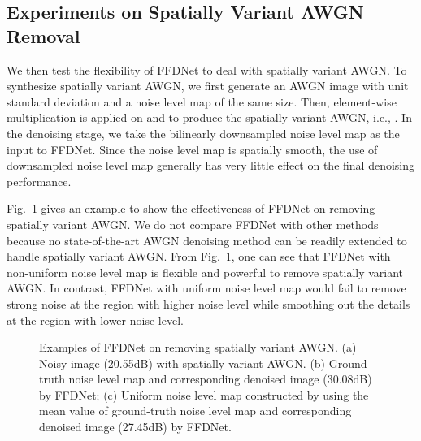 \documentclass[journal]{IEEEtran}
\begin{document}
\subsection{Experiments on Spatially Variant AWGN Removal}
We then test the flexibility of FFDNet to deal with spatially variant AWGN. To synthesize spatially variant AWGN, we first generate an AWGN image  with unit standard deviation and a noise level map  of the same size. Then, element-wise multiplication is applied on  and  to produce the spatially variant AWGN, i.e., .
In the denoising stage, we take the bilinearly downsampled noise level map as the input to FFDNet. Since the noise level map is spatially smooth, the use of downsampled noise level map generally has very little effect on the final denoising performance.


Fig.~\ref{fig_sv1} gives an example to show the effectiveness of FFDNet on removing spatially variant AWGN. We do not compare FFDNet with other methods because no state-of-the-art AWGN denoising method can be readily extended to handle spatially variant AWGN. From Fig.~\ref{fig_sv1}, one can see that FFDNet with non-uniform noise level map is flexible and powerful to remove spatially variant AWGN.
In contrast, FFDNet with uniform noise level map would fail to remove strong noise at the region with higher noise level while smoothing out the details at the region with lower noise level.


\begin{figure}[!htbp]
\setlength{\abovecaptionskip}{0pt}
\setlength{\belowcaptionskip}{0pt}
\centering
{}
\caption{Examples of FFDNet on removing spatially variant AWGN. (a) Noisy image (20.55dB) with spatially variant AWGN. (b) Ground-truth noise level map and corresponding denoised image (30.08dB) by FFDNet; (c) Uniform noise level map constructed by using the mean value of ground-truth noise level map and corresponding denoised image (27.45dB) by FFDNet.}
\label{fig_sv1}
\end{figure}
\end{document}
